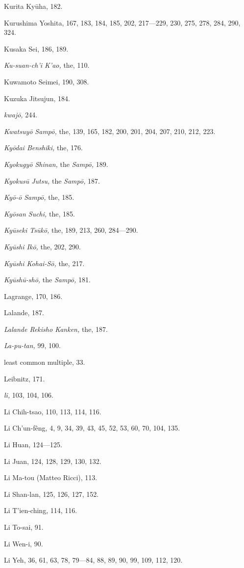 \documentclass[11pt]{article}
\begin{document}
Kurita Kyūha, 182.\par
Kurushima Yoshita, 167, 183, 184, 185, 202, 217---229, 230, 275, 278, 284, 290, 324.\par
Kusaka Sei, 186, 189.\par
\emph{Ku-suan-ch'i K'ao,} the, 110.\par
Kuwamoto Seimei, 190, 308.\par
Kuzuka Jitsujun, 184.\par
\emph{kwajō,} 244.\par
\emph{Kwatsuyō Sampō,} the, 139, 165, 182, 200, 201, 204, 207, 210, 212, 223.\par
\emph{Kyōdai Benshiki,} the, 176.\par
\emph{Kyokugyō Shinan,} the \emph{Sampō,} 189.\par
\emph{Kyokusū Jutsu,} the \emph{Sampō,} 187.\par
\emph{Kyō-ō Sampō,} the, 185.\par
\emph{Kyōsan Suchi,} the, 185.\par
\emph{Kyūseki Tsūkō,} the, 189, 213, 260, 284---290.\par
\emph{Kyūshi Ikō,} the, 202, 290.\par
\emph{Kyūshi Kohai-Sō,} the, 217.\par
\emph{Kyūshū-shō,} the \emph{Sampō,} 181.\par
\medskip
Lagrange, 170, 186.\par
Lalande, 187.\par
\emph{Lalande Rekisho Kanken,} the, 187.\par
\emph{La-pu-tan,} 99, 100.\par
least common multiple, 33.\par
Leibnitz, 171.\par
\emph{li,} 103, 104, 106.\par
Li Chih-tsao, 110, 113, 114, 116.\par
Li Ch'un-fêng, 4, 9, 34, 39, 43, 45, 52, 53, 60, 70, 104, 135.\par
Li Huan, 124---125.\par
Li Juan, 124, 128, 129, 130, 132.\par
Li Ma-tou (Matteo Ricci), 113.\par
Li Shan-lan, 125, 126, 127, 152.\par
Li T'ien-ching, 114, 116.\par
Li To-sai, 91.\par
Li Wen-i, 90.\par
Li Yeh, 36, 61, 63, 78, 79---84, 88, 89, 90, 99, 109, 112, 120.\par
\end{document}
